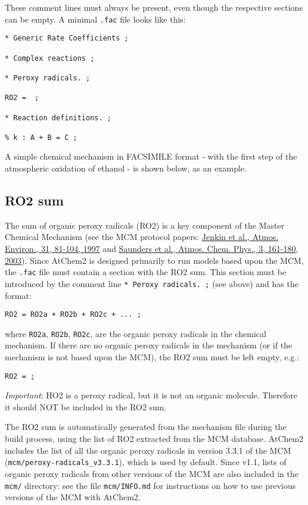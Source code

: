 These comment lines must always be present, even though the respective
sections can be empty. A minimal \texttt{.fac} file looks like this:

\begin{verbatim}
* Generic Rate Coefficients ;

* Complex reactions ;

* Peroxy radicals. ;

RO2 =  ;

* Reaction definitions. ;

% k : A + B = C ;
\end{verbatim}

A simple chemical mechanism in FACSIMILE format - with the first step of
the atmospheric oxidation of ethanol - is shown below, as an example.

\hypertarget{ro2-sum}{%
\subsection{RO2 sum}\label{ro2-sum}}

The sum of organic peroxy radicals (RO2) is a key component of the
Master Chemical Mechanism (see the MCM protocol papers:
\href{https://doi.org/10.1016/S1352-2310(96)00105-7}{Jenkin et al.,
Atmos. Environ., 31, 81-104, 1997} and
\href{https://doi.org/10.5194/acp-3-161-2003}{Saunders et al., Atmos.
Chem. Phys., 3, 161-180, 2003}). Since AtChem2 is designed primarily to
run models based upon the MCM, the \texttt{.fac} file must contain a
section with the RO2 sum. This section must be introduced by the comment
line \texttt{*\ Peroxy\ radicals.\ ;} (see above) and has the format:

\begin{verbatim}
RO2 = RO2a + RO2b + RO2c + ... ;
\end{verbatim}

where \texttt{RO2a}, \texttt{RO2b}, \texttt{RO2c}, are the organic
peroxy radicals in the chemical mechanism. If there are no organic
peroxy radicals in the mechanism (or if the mechanism is not based upon
the MCM), the RO2 sum must be left empty, e.g.:

\begin{verbatim}
RO2 = ;
\end{verbatim}

\emph{Important}: HO2 is a peroxy radical, but it is not an organic
molecule. Therefore it should NOT be included in the RO2 sum.

The RO2 sum is automatically generated from the mechanism file during
the build process, using the list of RO2 extracted from the MCM
database. AtChem2 includes the list of all the organic peroxy radicals
in version 3.3.1 of the MCM (\texttt{mcm/peroxy-radicals\_v3.3.1}),
which is used by default. Since v1.1, lists of organic peroxy radicals
from other versions of the MCM are also included in the \texttt{mcm/}
directory: see the file \texttt{mcm/INFO.md} for instructions on how to
use previous versions of the MCM with AtChem2.


